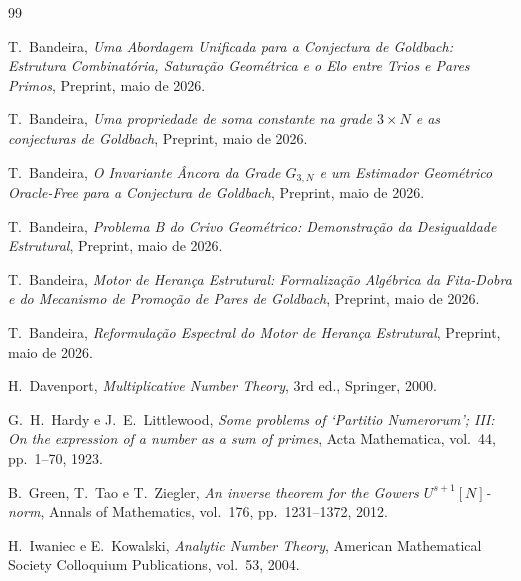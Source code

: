 \documentclass[12pt,a4paper]{article}
\theoremstyle{definition}
\newcommand{\1}[1]{\mathbf{1}_{#1}}
\begin{document}
	\begin{thebibliography}{99}
		
		T.~Bandeira,
		\textit{Uma Abordagem Unificada para a Conjectura de Goldbach: Estrutura
			Combinatória, Saturação Geométrica e o Elo entre Trios e Pares Primos},
		Preprint, maio de 2026.
		
		T.~Bandeira,
		\textit{Uma propriedade de soma constante na grade $3 \times N$ e as
			conjecturas de Goldbach},
		Preprint, maio de 2026.
		
		T.~Bandeira,
		\textit{O Invariante Âncora da Grade $G_{3,N}$ e um Estimador Geométrico
			Oracle-Free para a Conjectura de Goldbach},
		Preprint, maio de 2026.
		
		T.~Bandeira,
		\textit{Problema B do Crivo Geométrico: Demonstração da Desigualdade
			Estrutural},
		Preprint, maio de 2026.
		
		T.~Bandeira,
		\textit{Motor de Herança Estrutural: Formalização Algébrica da Fita-Dobra
			e do Mecanismo de Promoção de Pares de Goldbach},
		Preprint, maio de 2026.
		
		T.~Bandeira,
		\textit{Reformulação Espectral do Motor de Herança Estrutural},
		Preprint, maio de 2026.
		
		H.~Davenport,
		\textit{Multiplicative Number Theory},
		3rd ed., Springer, 2000.
		
		G.~H.~Hardy e J.~E.~Littlewood,
		\textit{Some problems of `Partitio Numerorum'; III: On the expression of a
			number as a sum of primes},
		Acta Mathematica, vol.~44, pp.~1--70, 1923.
		
		B.~Green, T.~Tao e T.~Ziegler,
		\textit{An inverse theorem for the Gowers $U^{s+1}[N]$-norm},
		Annals of Mathematics, vol.~176, pp.~1231--1372, 2012.
		
		H.~Iwaniec e E.~Kowalski,
		\textit{Analytic Number Theory},
		American Mathematical Society Colloquium Publications, vol.~53, 2004.
		
	\end{thebibliography}
	
\end{document}
